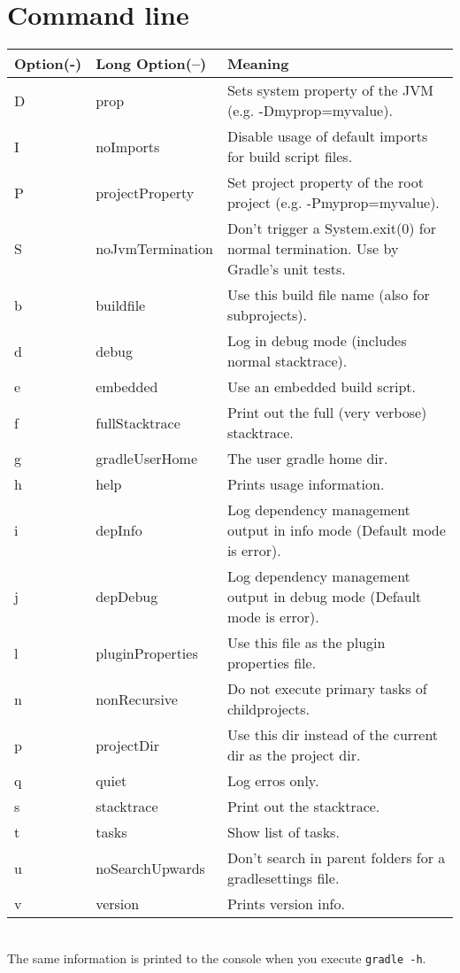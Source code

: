 \chapter{Command line} %
\label{cha:command_line}

\begin{tabular}{l|l|l}
\textbf{Option}(-) & \textbf{Long Option}(--) & \textbf{Meaning}\\ \hline
D & prop             & Sets system property of the JVM (e.g. -Dmyprop=myvalue).\\ 
I & noImports        & Disable usage of default imports for build script files.\\
P & projectProperty  & Set project property of the root project (e.g. -Pmyprop=myvalue).\\
S & noJvmTermination & Don't trigger a System.exit(0) for normal termination. Use by Gradle's unit tests.\\
b & buildfile        & Use this build file name (also for subprojects).\\
d & debug            & Log in debug mode (includes normal stacktrace).\\
e & embedded         & Use an embedded build script.\\
f & fullStacktrace   & Print out the full (very verbose) stacktrace.\\
g & gradleUserHome   & The user gradle home dir.\\
h & help             & Prints usage information.\\
i & depInfo          & Log dependency management output in info mode (Default mode is error).\\
j & depDebug         & Log dependency management output in debug mode (Default mode is error).\\
l & pluginProperties & Use this file as the plugin properties file.\\
n & nonRecursive     & Do not execute primary tasks of childprojects.\\
p & projectDir       & Use this dir instead of the current dir as the project dir.\\
q & quiet            & Log erros only.\\
s & stacktrace       & Print out the stacktrace.\\
t & tasks            & Show list of tasks.\\
u & noSearchUpwards  & Don't search in parent folders for a gradlesettings file.\\
v & version          & Prints version info.\\
\end{tabular}
\\
 
\noindent The same information is printed to the console when you execute \texttt{gradle -h}.\\
